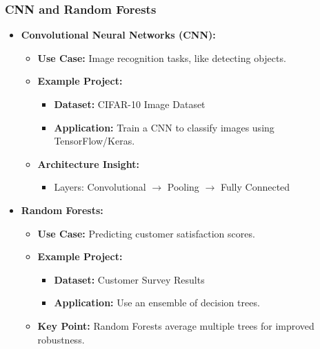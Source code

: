 \documentclass[aspectratio=169]{beamer}
\begin{document}
\begin{frame}[fragile]
    \frametitle{CNN and Random Forests}
    \begin{itemize}
        \item \textbf{Convolutional Neural Networks (CNN):}
        \begin{itemize}
            \item \textbf{Use Case:} Image recognition tasks, like detecting objects.
            \item \textbf{Example Project:}
            \begin{itemize}
                \item \textbf{Dataset:} CIFAR-10 Image Dataset
                \item \textbf{Application:} Train a CNN to classify images using TensorFlow/Keras.
            \end{itemize}
            \item \textbf{Architecture Insight:} 
            \begin{itemize}
                \item Layers: Convolutional $\to$ Pooling $\to$ Fully Connected
            \end{itemize}
        \end{itemize}

        \item \textbf{Random Forests:}
        \begin{itemize}
            \item \textbf{Use Case:} Predicting customer satisfaction scores.
            \item \textbf{Example Project:}
            \begin{itemize}
                \item \textbf{Dataset:} Customer Survey Results
                \item \textbf{Application:} Use an ensemble of decision trees.
            \end{itemize}
            \item \textbf{Key Point:} Random Forests average multiple trees for improved robustness.
        \end{itemize}
    \end{itemize}
\end{frame}
\end{document}

